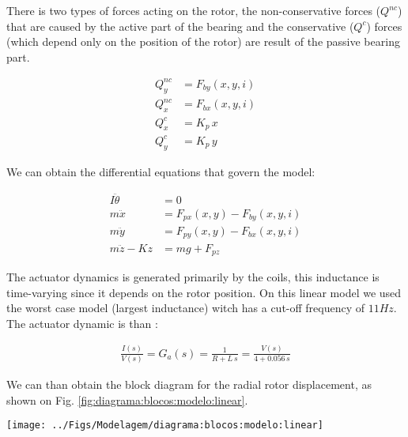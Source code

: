 \documentclass[journal,a4paper,oneside,twocolumn]{IEEEtran}
\begin{document}
There is two types of forces acting on the rotor, the  non-conservative forces ($Q^{nc}$) that are caused by the active part of the bearing and the conservative ($Q^{c}$) forces (which depend only on the position of the rotor) are result of the passive bearing part.
 
  \begin{align}
  	Q_y^{nc} &= F_{by}(x,y,i)  \\
  	Q_x^{nc} &= F_{bx}(x,y,i)  \\
	Q^{c}_x &= K_p \, x \\
	Q^{c}_y &= K_p \, y 
  \end{align}
  
    We can obtain the differential equations that govern the model:

  
   \begin{align}
  	I \ddot{\theta} &= 0 \\
  	m \ddot{x}		&=  F_{px}(x,y) - F_{by}(x,y,i) \\
  	m \ddot{y}		&=  F_{py}(x,y) - F_{bx}(x,y,i)\\	
  	m \ddot{z} - K z &= m g  + F_{pz}
   \end{align}
   

The actuator dynamics is generated primarily by the coils,  this inductance is time-varying since it depends on the rotor position. On this linear model we used the worst case model (largest inductance) witch has a cut-off frequency of $11Hz$. The actuator dynamic is than :

\begin{align}
	\frac{I(s)}{V(s)} = G_a(s) = \frac{1}{R + L \, s} = \frac{V(s)}{4 + 0.056 \, s}
\end{align}

We can than obtain the block diagram for the radial rotor displacement, as shown on Fig. \ref{fig:diagrama:blocos:modelo:linear}.

\begin{figure*}[th!]
\centering
\texttt{[image: ../Figs/Modelagem/diagrama:blocos:modelo:linear]}
\caption{Diagrama de blocos do modelo linearizado para descolamentos em x e y}
\label{fig:diagrama:blocos:modelo:linear}
\end{figure*}
\end{document}

